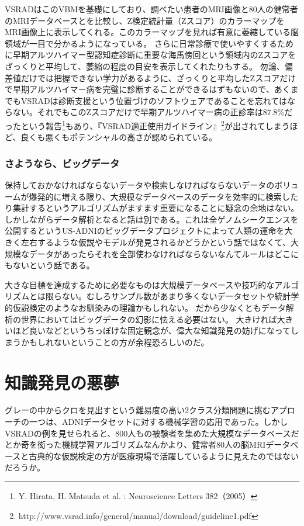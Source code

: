VSRADはこのVBMを基礎にしており、調べたい患者のMRI画像と80人の健常者のMRIデータベースとを比較し、Z検定統計量（Zスコア）のカラーマップをMRI画像上に表示してくれる。このカラーマップを見れば有意に萎縮している脳領域が一目で分かるようになっている。
さらに日常診療で使いやすくするために早期アルツハイマー型認知症診断に重要な海馬傍回という領域内のZスコアをざっくりと平均して、萎縮の程度の目安を表示してくれたりもする。
勿論、偏差値だけでは把握できない学力があるように、ざっくりと平均したZスコアだけで早期アルツハイマー病を完璧に診断することができるはずもないので、あくまでもVSRADは診断支援という位置づけのソフトウェアであることを忘れてはならない。それでもこのZスコアだけで早期アルツハイマー病の正診率は87.8\%だったという報告\footnote{Y. Hirata, H. Matsuda et al. : Neuroscience Letters 382（2005）}もあり、『VSRAD適正使用ガイドライン』\footnote{http://www.vsrad.info/general/manual/download/guideline1.pdf}が出されてしまうほど、良くも悪くもポテンシャルの高さが認められている。

\subsubsection{さようなら、ビッグデータ}
保持しておかなければならないデータや検索しなければならないデータのボリュームが爆発的に増える限り、大規模なデータベースのデータを効率的に検索したり集計するというアルゴリズムがますます重要になることに疑念の余地はない。
しかしながらデータ解析となると話は別である。これは全ゲノムシークエンスを公開するというUS-ADNIのビッグデータプロジェクトによって人類の運命を大きく左右するような仮説やモデルが発見されるかどうかという話ではなくて、大規模なデータがあったらそれを全部使わなければならないなんてルールはどこにもないという話である。

大きな目標を達成するために必要なものは大規模データベースや技巧的なアルゴリズムとは限らない。むしろサンプル数があまり多くないデータセットや統計学的仮説検定のようなお馴染みの理論かもしれない。
だから少なくともデータ解析の世界においてはビッグデータの幻影に怯える必要はない。
大きければ大きいほど良いなどというちっぽけな固定観念が、偉大な知識発見の妨げになってしまうかもしれないということの方が余程恐ろしいのだ。

\section{知識発見の悪夢}
グレーの中からクロを見出すという難易度の高い2クラス分類問題に挑むアプローチの一つは、ADNIデータセットに対する機械学習の応用であった。しかしVSRADの例を見せられると、800人もの被験者を集めた大規模なデータベースだとか奇を衒った機械学習アルゴリズムなんかより、健常者80人の脳MRIデータベースと古典的な仮説検定の方が医療現場で活躍しているように見えたのではないだろうか。

